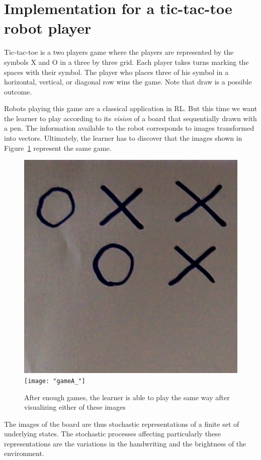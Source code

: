\documentclass[letterpaper, 10.5 pt, conference]{ieeeconf}
\begin{document}
\section{Implementation for a tic-tac-toe robot player}

Tic-tac-toe is a two players game where the players are represented by the symbols X and O in a three by three grid. Each player takes turns marking the spaces with their symbol. The player who places three of his symbol in a horizontal, vertical, or diagonal row wins the game. Note that draw is a possible outcome.

Robots playing this game are a classical application in RL. But this time we want the learner to play according to its \textit{vision} of a board that sequentially drawn with a pen. The information available to the robot corresponds to images transformed into vectors. Ultimately, the learner has to discover that the images shown in Figure~\ref{fig:gameA} represent the same game.

\begin{figure}
\begin{center}
\includegraphics[scale=.14]{"gameA"}
\texttt{[image: "gameA\_"]}
\caption{After enough games, the learner is able to play the same way after visualizing either of these images}
\label{fig:gameA}
\end{center}
\end{figure}

The images of the board are thus stochastic representations of a finite set of underlying states. The stochastic processes affecting particularly these representations are the variations in the handwriting and the brightness of the environment.
\end{document}
